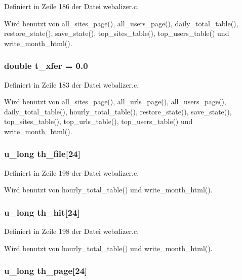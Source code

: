 Definiert in Zeile 186 der Datei webalizer.c.

Wird benutzt von all\_\-sites\_\-page(), all\_\-users\_\-page(), daily\_\-total\_\-table(), restore\_\-state(), save\_\-state(), top\_\-sites\_\-table(), top\_\-users\_\-table() und write\_\-month\_\-html().
\subsubsection{\setlength{\rightskip}{0pt plus 5cm}double {\bf t\_\-xfer} = 0.0}\label{webalizer_8c_1952e11824da591d81fdf3371627ae86}




Definiert in Zeile 183 der Datei webalizer.c.

Wird benutzt von all\_\-sites\_\-page(), all\_\-urls\_\-page(), all\_\-users\_\-page(), daily\_\-total\_\-table(), hourly\_\-total\_\-table(), restore\_\-state(), save\_\-state(), top\_\-sites\_\-table(), top\_\-urls\_\-table(), top\_\-users\_\-table() und write\_\-month\_\-html().
\subsubsection{\setlength{\rightskip}{0pt plus 5cm}u\_\-long {\bf th\_\-file}[24]}\label{webalizer_8c_8d6ce1fa8aba3c7f1ed1c7e19ea0541c}




Definiert in Zeile 198 der Datei webalizer.c.

Wird benutzt von hourly\_\-total\_\-table() und write\_\-month\_\-html().
\subsubsection{\setlength{\rightskip}{0pt plus 5cm}u\_\-long {\bf th\_\-hit}[24]}\label{webalizer_8c_2c634f4ff63cf16a5bb219632d9da1f5}




Definiert in Zeile 198 der Datei webalizer.c.

Wird benutzt von hourly\_\-total\_\-table() und write\_\-month\_\-html().
\subsubsection{\setlength{\rightskip}{0pt plus 5cm}u\_\-long {\bf th\_\-page}[24]}\label{webalizer_8c_cdb9ccdbdd487d188cd174056a7dcd80}




